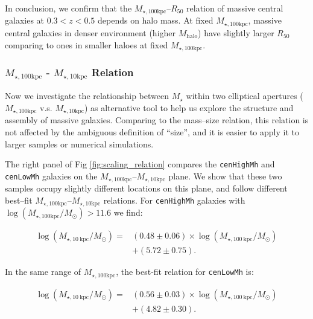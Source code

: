 \documentclass[a4paper,fleqn,usenatbib]{mnras}
\def\rbcg{\texttt{cenHighMh}}
\def\nbcg{\texttt{cenLowMh}}
\def\mstar{{$M_{\star}$}}
\def\mhalo{{$M_{\mathrm{halo}}$}}
\def\minn{{$M_{\star,10\mathrm{kpc}}$}}
\def\mtot{{$M_{\star,100\mathrm{kpc}}$}}
\def\logmtot{{$\log (M_{\star,100\mathrm{kpc}}/M_{\odot})$}}
\begin{document}
    In conclusion, we confirm that the \mtot{}--$R_{\mathrm{50}}$ relation of massive
    central galaxies at $0.3 < z < 0.5$ depends on halo mass. 
    At fixed \mtot{}, massive central galaxies in denser environment (higher \mhalo{}) 
    have slightly larger $R_{\mathrm{50}}$ comparing to ones in smaller haloes at fixed 
    \mtot{}. 
    
\subsubsection{\mtot{} - \minn{} Relation}
    \label{sssec:m100_m10}
    
    Now we investigate the relationship between \mstar{} within two elliptical 
    apertures (\mtot{} v.s. \minn{}) as alternative tool to help us explore the 
    structure and assembly of massive galaxies.
    Comparing to the mass--size relation, this relation is not affected by the 
    ambiguous definition of ``size'', and it is easier to apply it to larger 
    samples or numerical simulations. 
    
    The right panel of Fig \ref{fig:scaling_relation} compares the \rbcg{} and \nbcg{}
    galaxies on the \mtot{}--\minn{} plane.
    We show that these two samples occupy slightly different locations on this plane,
    and follow different best--fit \mtot{}--\minn{} relations. 
    For \rbcg{} galaxies with \logmtot{}$>11.6$ we find:
    
    \begin{equation}
        \begin{aligned}
        \log (M_{\star, 10\ \mathrm{kpc}}/M_{\odot}) = & (0.48\pm0.06) \times \log (M_{\star, 100\ \mathrm{kpc}}/M_{\odot}) \\ & +(5.72\pm0.75).
        \end{aligned}
    \end{equation}
    
    \noindent In the same range of \mtot{}, the best-fit relation for \nbcg{} is:
     
    \begin{equation}
        \begin{aligned}
        \log (M_{\star, 10\ \mathrm{kpc}}/M_{\odot}) = & (0.56\pm0.03) \times \log (M_{\star, 100\ \mathrm{kpc}}/M_{\odot}) \\ & +(4.82\pm0.30).
        \end{aligned}
    \end{equation}
    
\end{document}
